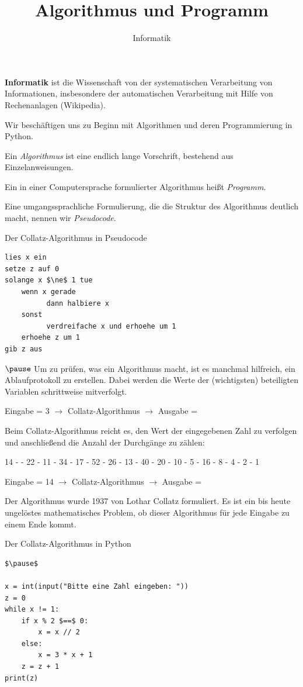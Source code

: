 \documentclass[10pt]{beamer}
\begin{document}
\title{Algorithmus und Programm}   
\author{Informatik} 
\date{ } 

\frame{\titlepage} 

\begin{frame}[fragile]
\textbf{Informatik} ist die Wissenschaft von der systematischen Verarbeitung von Informationen, insbesondere der automatischen Verarbeitung mit Hilfe von Rechenanlagen (Wikipedia).  

Wir beschäftigen uns zu Beginn mit Algorithmen und deren Programmierung in Python. 

Ein \textit{Algorithmus} ist eine endlich lange Vorschrift, bestehend aus Einzelanweisungen. \pause

Ein in einer Computersprache formulierter Algorithmus heißt \textit{Programm}.  

Eine umgangssprachliche Formulierung, die die Struktur des Algorithmus deutlich macht, nennen wir  \textit{Pseudocode}. 

\end{frame}

\begin{frame}[fragile]

Der Collatz-Algorithmus in Pseudocode
\begin{lstlisting} 
lies x ein    
setze z auf 0
solange x $\ne$ 1 tue
    wenn x gerade
          dann halbiere x
    sonst 
          verdreifache x und erhoehe um 1
    erhoehe z um 1
gib z aus     
\end{lstlisting} $\pause$
Um zu prüfen, was ein Algorithmus macht, ist es manchmal hilfreich, ein Ablaufprotokoll zu erstellen. Dabei werden die Werte der (wichtigsten) beteiligten Variablen schrittweise mitverfolgt. 

Eingabe = 3 $\rightarrow$ Collatz-Algorithmus  $\rightarrow$ Ausgabe =  


\end{frame}

\begin{frame}[fragile]
Beim Collatz-Algorithmus reicht es, den Wert der eingegebenen Zahl zu verfolgen und anschließend die Anzahl der Durchgänge zu zählen:

14 -  - 22 - 11 - 34 - 17 - 52 - 26 - 13 - 40 - 20 - 10 - 5 - 16 - 8 - 4 - 2 - 1

Eingabe = 14 $\rightarrow$ Collatz-Algorithmus  $\rightarrow$ Ausgabe =   \pause 

Der Algorithmus wurde 1937 von Lothar Collatz formuliert. 
Es ist ein bis heute ungelöstes mathematisches Problem, ob dieser Algorithmus für jede Eingabe zu einem Ende kommt.
\end{frame}
\begin{frame}[fragile]
Der Collatz-Algorithmus in Python

\begin{lstlisting} 
$\pause$

x = int(input("Bitte eine Zahl eingeben: "))  
z = 0
while x != 1:
    if x % 2 $==$ 0:
        x = x // 2
    else:
        x = 3 * x + 1
    z = z + 1
print(z)
\end{lstlisting} 
\end{frame}
\end{document}
